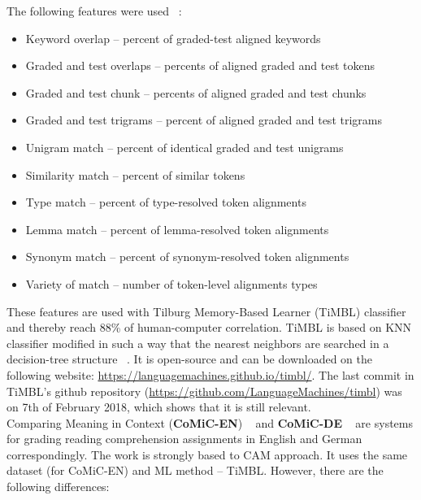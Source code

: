  The following features were used ~\cite{CAM}:
\begin{itemize}
\item Keyword overlap -- percent of graded-test aligned keywords 
\item Graded and test overlaps -- percents of aligned graded and test tokens 
\item Graded and test chunk -- percents of aligned graded and test chunks
\item Graded and test trigrams -- percent of aligned graded and test trigrams
\item Unigram match -- percent of identical graded and test unigrams
\item Similarity match -- percent of similar tokens
\item Type match -- percent of type-resolved token alignments
\item Lemma match -- percent of lemma-resolved token alignments
\item Synonym match -- percent of synonym-resolved token alignments
\item Variety of match -- number of token-level alignments types
\end{itemize}

These features are used with Tilburg Memory-Based Learner (TiMBL) classifier and thereby reach 88\% of human-computer correlation. TiMBL is based on KNN classifier modified in such a way that the nearest neighbors are searched in a decision-tree structure ~\cite{TiMBL}. It is open-source and can be downloaded on the following website: \url{https://languagemachines.github.io/timbl/}. The last commit in TiMBL's github repository (\url{https://github.com/LanguageMachines/timbl}) was on 7th of February 2018, which shows that it is still relevant. \\

Comparing Meaning in Context (\textbf{CoMiC-EN}) ~\cite{CoMiC-EN} and \textbf{CoMiC-DE} ~\cite{CoMiC-DE} are systems for grading reading comprehension assignments in English and German correspondingly. The work is strongly based to CAM approach. It uses the same dataset (for CoMiC-EN) and ML method -- TiMBL. However, there are the following differences:

